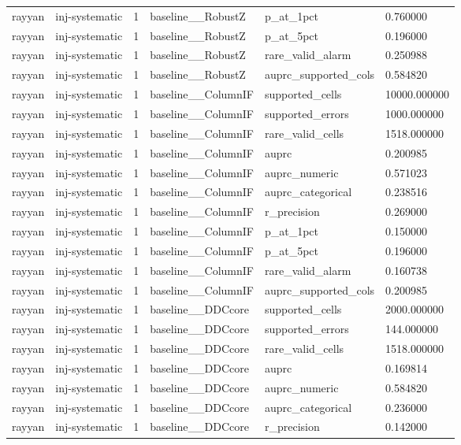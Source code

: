 \begin{tabular}{llllll}
rayyan & inj-systematic & 1 & baseline\_\_RobustZ & p\_at\_1pct & 0.760000 \\
rayyan & inj-systematic & 1 & baseline\_\_RobustZ & p\_at\_5pct & 0.196000 \\
rayyan & inj-systematic & 1 & baseline\_\_RobustZ & rare\_valid\_alarm & 0.250988 \\
rayyan & inj-systematic & 1 & baseline\_\_RobustZ & auprc\_supported\_cols & 0.584820 \\
rayyan & inj-systematic & 1 & baseline\_\_ColumnIF & supported\_cells & 10000.000000 \\
rayyan & inj-systematic & 1 & baseline\_\_ColumnIF & supported\_errors & 1000.000000 \\
rayyan & inj-systematic & 1 & baseline\_\_ColumnIF & rare\_valid\_cells & 1518.000000 \\
rayyan & inj-systematic & 1 & baseline\_\_ColumnIF & auprc & 0.200985 \\
rayyan & inj-systematic & 1 & baseline\_\_ColumnIF & auprc\_numeric & 0.571023 \\
rayyan & inj-systematic & 1 & baseline\_\_ColumnIF & auprc\_categorical & 0.238516 \\
rayyan & inj-systematic & 1 & baseline\_\_ColumnIF & r\_precision & 0.269000 \\
rayyan & inj-systematic & 1 & baseline\_\_ColumnIF & p\_at\_1pct & 0.150000 \\
rayyan & inj-systematic & 1 & baseline\_\_ColumnIF & p\_at\_5pct & 0.196000 \\
rayyan & inj-systematic & 1 & baseline\_\_ColumnIF & rare\_valid\_alarm & 0.160738 \\
rayyan & inj-systematic & 1 & baseline\_\_ColumnIF & auprc\_supported\_cols & 0.200985 \\
rayyan & inj-systematic & 1 & baseline\_\_DDCcore & supported\_cells & 2000.000000 \\
rayyan & inj-systematic & 1 & baseline\_\_DDCcore & supported\_errors & 144.000000 \\
rayyan & inj-systematic & 1 & baseline\_\_DDCcore & rare\_valid\_cells & 1518.000000 \\
rayyan & inj-systematic & 1 & baseline\_\_DDCcore & auprc & 0.169814 \\
rayyan & inj-systematic & 1 & baseline\_\_DDCcore & auprc\_numeric & 0.584820 \\
rayyan & inj-systematic & 1 & baseline\_\_DDCcore & auprc\_categorical & 0.236000 \\
rayyan & inj-systematic & 1 & baseline\_\_DDCcore & r\_precision & 0.142000 \\

\end{tabular}
